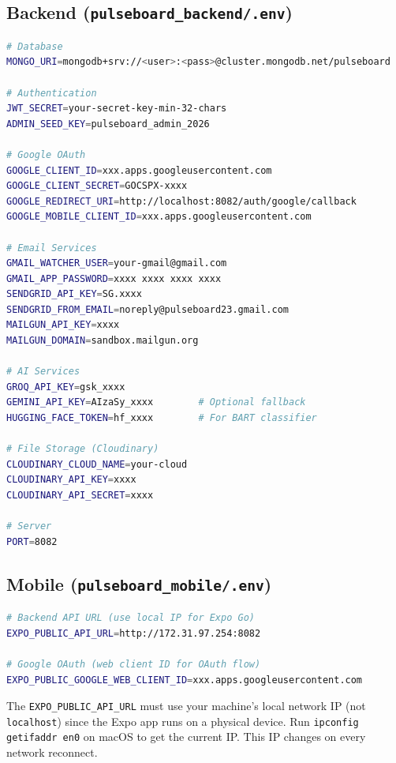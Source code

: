 \documentclass[12pt,a4paper]{report}
\newenvironment{warnbox}[1]{%
  \begin{tcolorbox}[
    enhanced, breakable,
    colback  = number!8,
    colframe = number!60,
    fonttitle= \bfseries\small,
    title    = {#1},
    left=6pt, right=6pt, top=4pt, bottom=4pt
  ]
}{%
  \end{tcolorbox}
}
\newcommand{\code}[1]{\texttt{\small\color{type}#1}}
\begin{document}
\subsection{Backend (\texttt{pulseboard\_backend/.env})}

\begin{lstlisting}[language=bash, caption={Backend Environment Variables}]
# Database
MONGO_URI=mongodb+srv://<user>:<pass>@cluster.mongodb.net/pulseboard

# Authentication
JWT_SECRET=your-secret-key-min-32-chars
ADMIN_SEED_KEY=pulseboard_admin_2026

# Google OAuth
GOOGLE_CLIENT_ID=xxx.apps.googleusercontent.com
GOOGLE_CLIENT_SECRET=GOCSPX-xxxx
GOOGLE_REDIRECT_URI=http://localhost:8082/auth/google/callback
GOOGLE_MOBILE_CLIENT_ID=xxx.apps.googleusercontent.com

# Email Services
GMAIL_WATCHER_USER=your-gmail@gmail.com
GMAIL_APP_PASSWORD=xxxx xxxx xxxx xxxx
SENDGRID_API_KEY=SG.xxxx
SENDGRID_FROM_EMAIL=noreply@pulseboard23.gmail.com
MAILGUN_API_KEY=xxxx
MAILGUN_DOMAIN=sandbox.mailgun.org

# AI Services
GROQ_API_KEY=gsk_xxxx
GEMINI_API_KEY=AIzaSy_xxxx        # Optional fallback
HUGGING_FACE_TOKEN=hf_xxxx        # For BART classifier

# File Storage (Cloudinary)
CLOUDINARY_CLOUD_NAME=your-cloud
CLOUDINARY_API_KEY=xxxx
CLOUDINARY_API_SECRET=xxxx

# Server
PORT=8082
\end{lstlisting}

\subsection{Mobile (\texttt{pulseboard\_mobile/.env})}

\begin{lstlisting}[language=bash, caption={Mobile Environment Variables}]
# Backend API URL (use local IP for Expo Go)
EXPO_PUBLIC_API_URL=http://172.31.97.254:8082

# Google OAuth (web client ID for OAuth flow)
EXPO_PUBLIC_GOOGLE_WEB_CLIENT_ID=xxx.apps.googleusercontent.com
\end{lstlisting}

\begin{warnbox}{Local Development Note}
The \code{EXPO\_PUBLIC\_API\_URL} must use your machine's local network IP (not \texttt{localhost}) since the Expo app runs on a physical device. Run \texttt{ipconfig getifaddr en0} on macOS to get the current IP. This IP changes on every network reconnect.
\end{warnbox}
\end{document}
